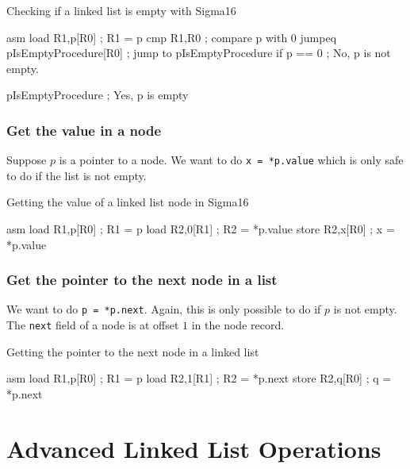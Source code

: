 \begin{highlight}{Checking if a linked list is empty with Sigma16}
	\begin{code}{asm}
		load R1,p[R0] ; R1 = p
		cmp R1,R0 ; compare p with 0
		jumpeq pIsEmptyProcedure[R0] ; jump to pIsEmptyProcedure if p == 0
		; No, p is not empty.

		pIsEmptyProcedure
		; Yes, p is empty
	\end{code}
\end{highlight}

\subsubsection{Get the value in a node}\label{ssub:get_the_value_in_a_node}

Suppose \(p\) is a pointer to a node.
We want to do \texttt{x = *p.value} which is only safe to do if the list is not empty.

\begin{highlight}{Getting the value of a linked list node in Sigma16}
\begin{code}{asm}
		load R1,p[R0] ; R1 = p
		load R2,0[R1] ; R2 = *p.value
		store R2,x[R0] ; x = *p.value
	\end{code}
\end{highlight}

\subsubsection{Get the pointer to the next node in a list}\label{ssub:get_the_pointer_to_the_next_node_in_a_list}

We want to do \texttt{p = *p.next}.
Again, this is only possible to do if \(p\) is not empty.
The \texttt{next} field of a node is at offset \(1\) in the node record.

\begin{highlight}{Getting the pointer to the next node in a linked list}
	\begin{code}{asm}
		load R1,p[R0] ; R1 = p
		load R2,1[R1] ; R2 = *p.next
		store R2,q[R0] ; q = *p.next
	\end{code}
\end{highlight}

\section{Advanced Linked List Operations}\label{sec:advanced_linked_list_operations}

